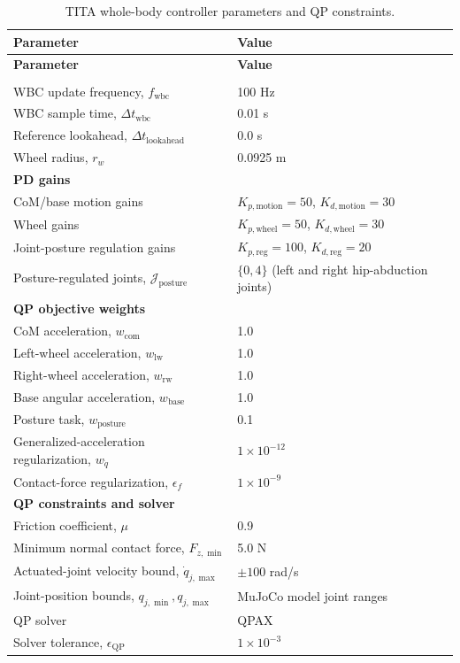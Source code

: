 \begingroup
\small
\setlength{\tabcolsep}{4pt}
\begingroup
\begin{longtable}{p{} p{}}
\caption{TITA whole-body controller parameters and QP constraints.}
\label{tab:tita_wbc_parameters}\\
\hline
\textbf{Parameter} & \textbf{Value} \\
\hline
\endfirsthead
\hline
\textbf{Parameter} & \textbf{Value} \\
\hline
\endhead
\hline
\endfoot
\hline
\endlastfoot
\multicolumn{2}{l}{\textbf{Timing and references}}\\
WBC update frequency, $f_{\mathrm{wbc}}$ & 100 Hz\\
WBC sample time, $\Delta t_{\mathrm{wbc}}$ & 0.01 s\\
Reference lookahead, $\Delta t_{\mathrm{lookahead}}$ & 0.0 s\\
Wheel radius, $r_w$ & 0.0925 m\\
\multicolumn{2}{l}{\textbf{PD gains}}\\
CoM/base motion gains & $K_{p,\mathrm{motion}}=50$, $K_{d,\mathrm{motion}}=30$\\
Wheel gains & $K_{p,\mathrm{wheel}}=50$, $K_{d,\mathrm{wheel}}=30$\\
Joint-posture regulation gains & $K_{p,\mathrm{reg}}=100$, $K_{d,\mathrm{reg}}=20$\\
Posture-regulated joints, $\mathcal{J}_{\mathrm{posture}}$ & $\{0,4\}$ (left and right hip-abduction joints)\\
\multicolumn{2}{l}{\textbf{QP objective weights}}\\
CoM acceleration, $w_{\mathrm{com}}$ & 1.0\\
Left-wheel acceleration, $w_{\mathrm{lw}}$ & 1.0\\
Right-wheel acceleration, $w_{\mathrm{rw}}$ & 1.0\\
Base angular acceleration, $w_{\mathrm{base}}$ & 1.0\\
Posture task, $w_{\mathrm{posture}}$ & 0.1\\
Generalized-acceleration regularization, $w_{\ddot{q}}$ & $1\times10^{-12}$\\
Contact-force regularization, $\epsilon_f$ & $1\times10^{-9}$\\
\multicolumn{2}{l}{\textbf{QP constraints and solver}}\\
Friction coefficient, $\mu$ & 0.9\\
Minimum normal contact force, $F_{z,\min}$ & 5.0 N\\
Actuated-joint velocity bound, $\dot{q}_{j,\max}$ & $\pm100$ rad/s\\
Joint-position bounds, $q_{j,\min},q_{j,\max}$ & MuJoCo model joint ranges\\
QP solver & QPAX\\
Solver tolerance, $\epsilon_{\mathrm{QP}}$ & $1\times10^{-3}$\\
\end{longtable}
\endgroup
\endgroup
